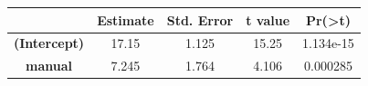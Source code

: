 \documentclass[]{article}
\begin{document}
\begin{longtable}[c]{@{}ccccc@{}}
\toprule
\begin{minipage}[b]{0.21\columnwidth}\centering\strut
~
\strut\end{minipage} &
\begin{minipage}[b]{0.13\columnwidth}\centering\strut
Estimate
\strut\end{minipage} &
\begin{minipage}[b]{0.16\columnwidth}\centering\strut
Std. Error
\strut\end{minipage} &
\begin{minipage}[b]{0.12\columnwidth}\centering\strut
t value
\strut\end{minipage} &
\begin{minipage}[b]{0.12\columnwidth}\centering\strut
Pr(\textgreater{}\textbar{}t\textbar{})
\strut\end{minipage}\tabularnewline
\midrule
\endhead
\begin{minipage}[t]{0.21\columnwidth}\centering\strut
\textbf{(Intercept)}
\strut\end{minipage} &
\begin{minipage}[t]{0.13\columnwidth}\centering\strut
17.15
\strut\end{minipage} &
\begin{minipage}[t]{0.16\columnwidth}\centering\strut
1.125
\strut\end{minipage} &
\begin{minipage}[t]{0.12\columnwidth}\centering\strut
15.25
\strut\end{minipage} &
\begin{minipage}[t]{0.12\columnwidth}\centering\strut
1.134e-15
\strut\end{minipage}\tabularnewline
\begin{minipage}[t]{0.21\columnwidth}\centering\strut
\textbf{manual}
\strut\end{minipage} &
\begin{minipage}[t]{0.13\columnwidth}\centering\strut
7.245
\strut\end{minipage} &
\begin{minipage}[t]{0.16\columnwidth}\centering\strut
1.764
\strut\end{minipage} &
\begin{minipage}[t]{0.12\columnwidth}\centering\strut
4.106
\strut\end{minipage} &
\begin{minipage}[t]{0.12\columnwidth}\centering\strut
0.000285
\strut\end{minipage}\tabularnewline
\bottomrule
\end{longtable}
\end{document}
